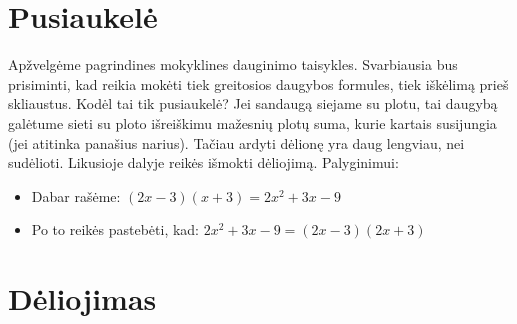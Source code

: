 \documentclass[a4paper]{article}
\begin{document}
\section{Pusiaukelė}
Apžvelgėme pagrindines mokyklines dauginimo taisykles. Svarbiausia bus prisiminti, kad reikia mokėti tiek greitosios daugybos formules, tiek iškėlimą prieš skliaustus. Kodėl tai tik pusiaukelė? Jei sandaugą siejame su plotu, tai daugybą galėtume sieti su ploto išreiškimu mažesnių plotų suma, kurie kartais susijungia (jei atitinka panašius narius). Tačiau ardyti dėlionę yra daug lengviau, nei sudėlioti. Likusioje dalyje reikės išmokti dėliojimą. Palyginimui:
\begin{itemize}
\item Dabar rašėme: $(2x-3)(x+3) = 2x^2 +3x - 9$
\item Po to reikės pastebėti, kad: $2x^2 +3x - 9 = (2x-3)(2x+3)$
\end{itemize}
\section{Dėliojimas}
\end{document}
